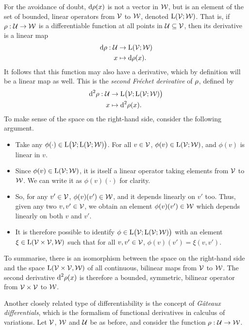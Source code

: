 For the avoidance of doubt, $\text{d} \rho(x)$ is not a vector in ${\mathcal W}$, but is an element of the set of bounded, linear operators from ${\mathcal V}$ to ${\mathcal W}$, denoted $\text{L}({\mathcal V};{\mathcal W})$.
That is, if $\rho :{\mathcal U}\to{\mathcal W}$ is a differentiable function at all points in ${\mathcal U}\subseteq{\mathcal V}$, then its derivative is a linear map
\begin{align*}
  \text{d} \rho : {\mathcal U} &\to \text{L}({\mathcal V};{\mathcal W}) \\
  x &\mapsto \text{d} \rho(x).
\end{align*}
It follows that this function may also have a derivative, which by definition will be a linear map as well.
This is the \emph{second Fréchet derivative} of $\rho$, defined by
\begin{align*}
  \text{d}^2 \rho : {\mathcal U} &\to \text{L}\big({\mathcal V};\text{L}({\mathcal V};{\mathcal W})\big) \\
  x &\mapsto \text{d}^2\rho(x).
\end{align*}
To make sense of the space on the right-hand side, consider the following argument.
\begin{itemize}
  \item Take any $\phi(\cdot) \in \text{L}\big({\mathcal V};\text{L}({\mathcal V};{\mathcal W})\big)$. For all $v\in{\mathcal V}$, $\phi(v)\in\text{L}({\mathcal V};{\mathcal W})$, and $\phi(v)$ is linear in $v$.
  \item Since $\phi(v)\in\text{L}({\mathcal V};{\mathcal W})$, it is itself a linear operator taking elements from ${\mathcal V}$ to ${\mathcal W}$. We can write it as $\phi(v)(\cdot)$ for clarity.
  \item So, for any $v'\in{\mathcal V}$, $\phi(v)(v')\in{\mathcal W}$, and it depends linearly on $v'$ too. Thus, given any two $v,v'\in{\mathcal V}$, we obtain an element $\phi(v)(v')\in{\mathcal W}$ which depends linearly on both $v$ and $v'$.
  \item It is therefore possible to identify $\phi \in \text{L}\big({\mathcal V};\text{L}({\mathcal V};{\mathcal W})\big)$ with an element $\xi \in \text{L}({\mathcal V} \times {\mathcal V}, {\mathcal W})$ such that for all $v,v'\in{\mathcal V}$, $\phi(v)(v') = \xi(v,v')$.
\end{itemize}
To summarise, there is an isomorphism between the space on the right-hand side and the space $\text{L}({\mathcal V} \times {\mathcal V}, {\mathcal W})$ of all continuous, bilinear maps from ${\mathcal V}$ to ${\mathcal W}$.
The second derivative $\text{d}^2 \rho(x)$ is therefore a bounded, symmetric, bilinear operator from ${\mathcal V}\times{\mathcal V}$ to ${\mathcal W}$.

Another closely related type of differentiability is the concept of \emph{Gâteaux differentials}, which is the formalism of functional derivatives in calculus of variations.
Let ${\mathcal V}$, ${\mathcal W}$ and ${\mathcal U}$ be as before, and consider the function $\rho :{\mathcal U}\to{\mathcal W}$.

